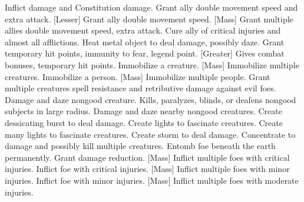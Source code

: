     {Inflict damage and Constitution damage.}
    {Grant ally double movement speed and extra attack.}
[Lesser]
    {Grant ally double movement speed.}
[Mass]
    {Grant multiple allies double movement speed, extra attack.}
    {Cure ally of critical injuries and almost all afflictions.}
    {Heat metal object to deal damage, possibly daze.}
    {Grant temporary hit points, immunity to fear, legend point.}
[Greater]
    {Gives combat bonuses, temporary hit points.}
    {Immobilize a creature.}
[Mass]
    {Immobilize multiple creatures.}
    {Immobilize a person.}
[Mass]
    {Immobilize multiple people.}
    {Grant multiple creatures spell resistance and retributive damage against evil foes.}
    {Damage and daze nongood creature.}
    {Kills, paralyzes, blinds, or deafens nongood subjects in large radius.}
    {Damage and daze nearby nongood creatures.}
    {Create dessicating burst to deal damage.}
    {Create lights to fascinate creatures.}
    {Create many lights to fascinate creatures.}
    {Create storm to deal damage.}
    {Concentrate to damage and possibly kill multiple creatures.}
    {Entomb foe beneath the earth permanently.}
    {Grant damage reduction.}
[Mass]
    {Inflict multiple foes with critical injuries.}
    {Inflict foe with critical injuries.}
[Mass]
    {Inflict multiple foes with minor injuries.}
    {Inflict foe with minor injuries.}
[Mass]
    {Inflict multiple foes with moderate injuries.}
